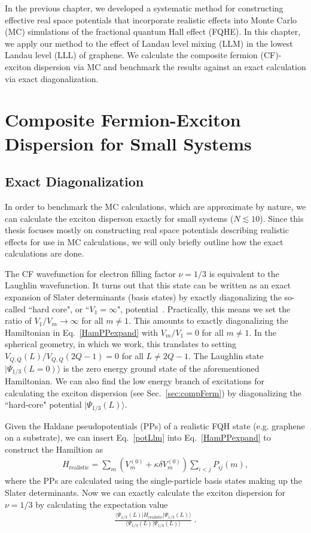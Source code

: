 \doublespacing

In the previous chapter, we developed a systematic method for constructing effective real space potentials that incorporate realistic effects into Monte Carlo (MC) simulations of the fractional quantum Hall effect (FQHE). In this chapter, we apply our method to the effect of Landau level mixing (LLM) in the lowest Landau level (LLL) of graphene. We calculate the composite fermion (CF)-exciton dispersion via MC and benchmark the results against an exact calculation via exact diagonalization.

\section{Composite Fermion-Exciton Dispersion for Small Systems} \label{sec:enGaps}

    \subsection{Exact Diagonalization} \label{ssec:exDi}
    In order to benchmark the MC calculations, which are approximate by nature, we can calculate the exciton disperson exactly for small systems ($N\lesssim 10$).  Since this thesis focuses mostly on constructing real space potentials describing realistic effects for use in MC calculations, we will only briefly outline how the exact calculations are done. 
    
    The CF wavefunction for electron filling factor $\nu=1/3$ is equivalent to the Laughlin wavefunction. It turns out that this state can be written as an exact expansion of Slater determinants (basis states) by exactly diagonalizing the so-called ``hard core", or ``$V_1=\infty$", potential~\cite{haldane}. Practically, this means we set the ratio of $V_1/V_m\rightarrow\infty$ for all $m\neq 1$. This amounts to exactly diagonalizing the Hamiltonian in Eq.~\ref{HamPPexpand} with $V_m/V_1=0$ for all $m\neq 1$. In the spherical geometry, in which we work, this translates to setting $V_{Q,Q}(L)/V_{Q,Q}(2Q-1)=0$ for all $L\neq 2Q -1$. The Laughlin state $|\Psi_{1/3}(L=0)\rangle$ is the zero energy ground state of the aforementioned Hamiltonian. We can also find the low energy branch of excitations for calculating the exciton dispersion (see Sec.~\ref{sec:compFerm}) by diagonalizing the ``hard-core" potential $|\Psi_{1/3}(L)\rangle$. 
    
    Given the Haldane pseudopotentials (PPs) of a realistic FQH state (e.g. graphene on a substrate), we can insert Eq.~\ref{potLlm} into Eq.~\ref{HamPPexpand} to construct the Hamiltion as
    \begin{eqnarray}
    H_\mathrm{realistic} = \sum_m (V_m^{(0)} + \kappa \delta V_m^{(0)})\sum_{i<j} P_{ij}(m),
    \end{eqnarray}
    where the PPs are calculated using the single-particle basis states making up the Slater determinants. Now we can exactly calculate the exciton dispersion for $\nu=1/3$ by calculating the expectation value
    \begin{eqnarray}
    \frac{\langle \Psi_{1/3}(L)|H_\mathrm{realistic}|\Psi_{1/3}(L)\rangle}{\langle \Psi_{1/3}(L)|\Psi_{1/3}(L)\rangle}\;.
    \end{eqnarray}
    
